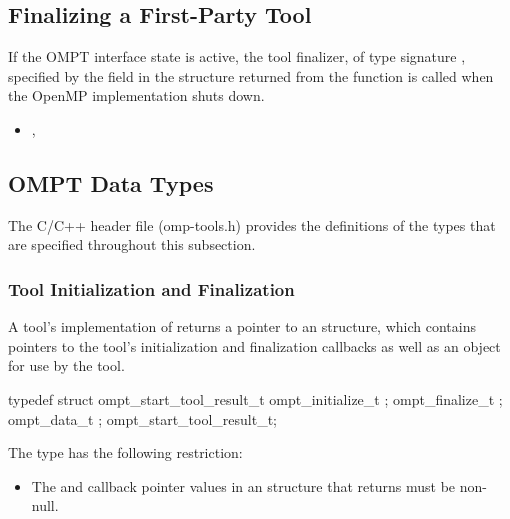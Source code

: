\subsection{Finalizing a First-Party Tool}
\label{sec:ompt-finalization}

If the OMPT interface state is active, the tool finalizer, of type signature , 
specified by the  field in the  
structure returned from the  function is called when the OpenMP
implementation shuts down.

\crossreferences
\begin{itemize}
\item {}, 
\end{itemize}



\subsection{OMPT Data Types}
\label{sec:ompt-data-types}

The C/C++ header file (omp-tools.h) provides the definitions of the 
types that are specified throughout this subsection.

\subsubsection{Tool Initialization and Finalization}
\label{sec:ompt_start_tool_result_t}

\summary
A tool's implementation of  returns a pointer to an
 structure, which contains pointers to the tool's
initialization and finalization callbacks as well as an  
object for use by the tool.

\format
\begin{ccppspecific}
\begin{omptOther}
typedef struct ompt_start_tool_result_t {
  ompt_initialize_t ;
  ompt_finalize_t ;
  ompt_data_t ;
} ompt_start_tool_result_t;
\end{omptOther}
\end{ccppspecific}

\restrictions
The  type has the following restriction:

\begin{itemize}
\item The  and  callback pointer values in an
       structure that  
      returns must be non-null.
\end{itemize}

